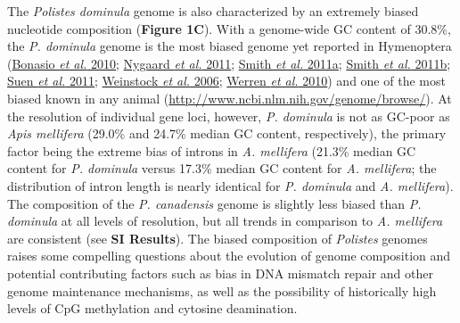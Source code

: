 The \textit{Polistes dominula} genome is also characterized by an
extremely biased nucleotide composition (\textbf{Figure 1C}). With a
genome-wide GC content of 30.8\%, the \textit{P. dominula} genome is the
most biased genome yet reported in Hymenoptera
(\protect\hyperlink{ux5fENREFux5f5}{Bonasio \textit{et al.} 2010};
\protect\hyperlink{ux5fENREFux5f37}{Nygaard \textit{et al.} 2011};
\protect\hyperlink{ux5fENREFux5f54}{Smith \textit{et al.} 2011a};
\protect\hyperlink{ux5fENREFux5f55}{Smith \textit{et al.} 2011b};
\protect\hyperlink{ux5fENREFux5f57}{Suen \textit{et al.} 2011};
\protect\hyperlink{ux5fENREFux5f69}{Weinstock \textit{et al.} 2006};
\protect\hyperlink{ux5fENREFux5f70}{Werren \textit{et al.} 2010}) and one
of the most biased known in any animal
(\url{http://www.ncbi.nlm.nih.gov/genome/browse/}). At the resolution of
individual gene loci, however, \textit{P. dominula} is not as GC-poor as
\textit{Apis mellifera} (29.0\% and 24.7\% median GC content,
respectively), the primary factor being the extreme bias of introns in
\textit{A. mellifera} (21.3\% median GC content for \textit{P. dominula}
versus 17.3\% median GC content for \textit{A. mellifera}; the
distribution of intron length is nearly identical for \textit{P. dominula}
and \textit{A. mellifera}). The composition of the \textit{P. canadensis}
genome is slightly less biased than \textit{P. dominula} at all levels of
resolution, but all trends in comparison to \textit{A. mellifera} are
consistent (see \textbf{SI Results}). The biased composition of
\textit{Polistes} genomes raises some compelling questions about the
evolution of genome composition and potential contributing factors such
as bias in DNA mismatch repair and other genome maintenance mechanisms,
as well as the possibility of historically high levels of CpG
methylation and cytosine deamination.

